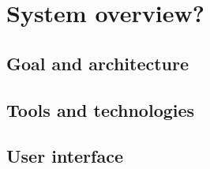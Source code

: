 \chapter{System overview?}
\label{chap:system}

\section{Goal and architecture}
\section{Tools and technologies}
\section{User interface}